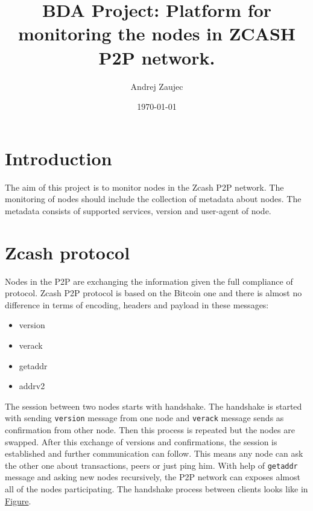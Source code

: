 \documentclass[11pt]{article}
\author{Andrej Zaujec}
\date{\today}
\title{BDA Project: Platform for monitoring the nodes in ZCASH P2P network.}
\begin{document}
\maketitle
\tableofcontents



\section{Introduction}
\label{sec:orgae2b13f}
The aim of this project is to monitor nodes in the Zcash P2P network. The monitoring of nodes should include the collection of metadata about nodes. The metadata consists of supported services, version and user-agent of node.
\section{Zcash protocol}
\label{sec:orge263eb7}
Nodes in the P2P are exchanging the information given the full compliance of protocol.
Zcash P2P protocol is based on the Bitcoin one and there is almost no difference in terms of encoding, headers and payload in these messages:
\begin{itemize}
\item version
\item verack
\item getaddr
\item addrv2
\end{itemize}
The session between two nodes starts with handshake.
The handshake is started with sending \texttt{version} message from one node and \texttt{verack} message sends as confirmation from other node. Then this process is repeated but the nodes are swapped. After this exchange of versions and confirmations, the session is established and further communication can follow. This means any node can ask the other one about transactions, peers or just ping him. With help of \texttt{getaddr} message and asking new nodes recursively, the P2P network can exposes almost all of the nodes participating.
The handshake process between clients looks like in \hyperref[fig-handshake]{Figure}.
\end{document}

